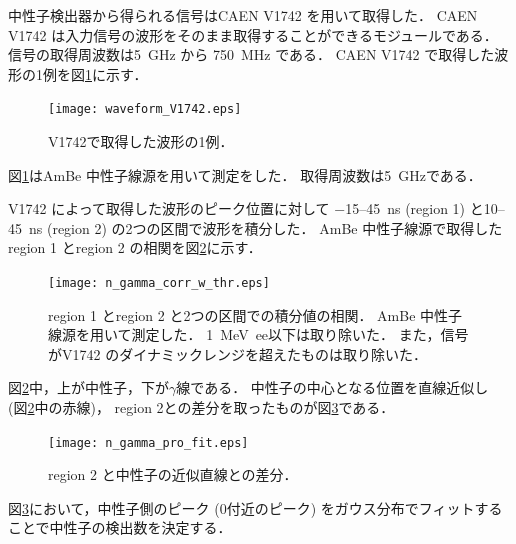 \documentclass[../master]{subfiles}
\begin{document}
中性子検出器から得られる信号はCAEN V1742 を用いて取得した．
CAEN V1742 は入力信号の波形をそのまま取得することができるモジュールである．
信号の取得周波数は\SI{5}{\giga\hertz} から \SI{750}{\mega\hertz} である．
CAEN V1742 で取得した波形の1例を図\ref{fig::waveform_V1742}に示す．
\begin{figure}
  \centering
  \texttt{[image: waveform\_V1742.eps]}
  \caption{V1742で取得した波形の1例．}
  \label{fig::waveform_V1742}
\end{figure}
図\ref{fig::waveform_V1742}はAmBe 中性子線源を用いて測定をした．
取得周波数は\SI{5}{\giga\hertz}である．

V1742 によって取得した波形のピーク位置に対して
\SI{-15}{}--\SI{45}{\nano\second} (region 1) と\SI{10}{}--\SI{45}{\nano\second} (region 2) の2つの区間で波形を積分した．
AmBe 中性子線源で取得したregion 1 とregion 2 の相関を図\ref{fig::n_gamma_correlation}に示す．
\begin{figure}
  \centering
  \texttt{[image: n\_gamma\_corr\_w\_thr.eps]}
  \caption[region 1 とregion 2 と2つの区間での積分値の相関．]
          {region 1 とregion 2 と2つの区間での積分値の相関．
            AmBe 中性子線源を用いて測定した．
            \SI{1}{\mega\electronvolt ee}以下は取り除いた．
            また，信号がV1742 のダイナミックレンジを超えたものは取り除いた．}
  \label{fig::n_gamma_correlation}
\end{figure}
図\ref{fig::n_gamma_correlation}中，上が中性子，下が$\gamma$線である．
中性子の中心となる位置を直線近似し (図\ref{fig::n_gamma_correlation}中の赤線)，
region 2との差分を取ったものが図\ref{fig::n_gamma_projection}である．
\begin{figure}
  \centering
  \texttt{[image: n\_gamma\_pro\_fit.eps]}
  \caption{region 2 と中性子の近似直線との差分．}
  \label{fig::n_gamma_projection}
\end{figure}
図\ref{fig::n_gamma_projection}において，中性子側のピーク (0付近のピーク)
をガウス分布でフィットすることで中性子の検出数を決定する．

\end{document}
